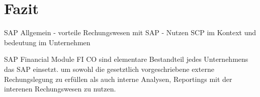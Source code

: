 \section{Fazit}
SAP Allgemein - vorteile
Rechungswesen mit SAP - Nutzen
SCP im Kontext und bedeutung im Unternehmen

SAP Financial Module FI CO sind elementare Bestandteil jedes Unternehmens das SAP einsetzt. um sowohl die gesetztlich vorgeschriebene externe Rechungslegung zu erfüllen als auch interne Analysen, Reportings mit der interenen Rechungswesen zu nutzen. 